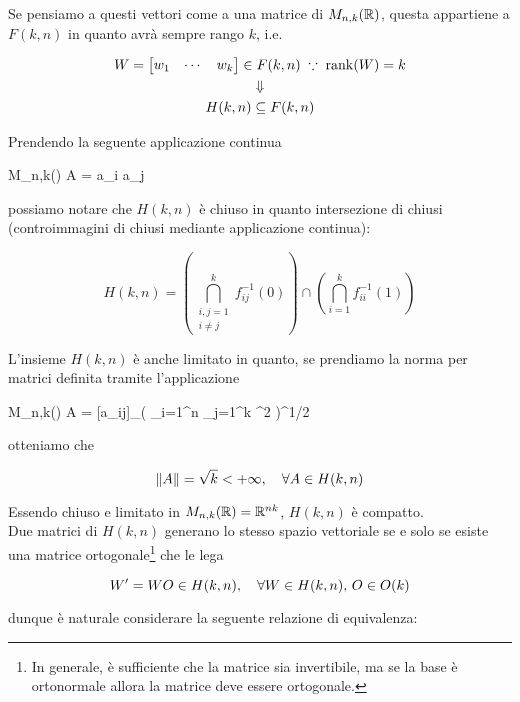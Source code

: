 {Se pensiamo a questi vettori come a una matrice di $ M_{n,k}(\mathbb{R}) $, questa appartiene a $ F(k,n) $ in quanto avrà sempre rango $ k $, i.e.

\begin{gather}
	W = \bmqty{ w_{1} & \cdots & w_{k} } \in F(k,n) %
	\; \because \; %
	\rank(W) = k \nonumber \\
	\Downarrow \\
	H(k,n) \subseteq F(k,n) \nonumber
\end{gather}

Prendendo la seguente applicazione continua

	{M_{n,k}(\R)}{\R}
	{A = }{a_{i} \cdot a_{j}}

possiamo notare che $ H(k,n) $ è chiuso in quanto intersezione di chiusi (controimmagini di chiusi mediante applicazione continua):

\begin{equation}
	H(k,n) = \left( \bigcap_{\substack{ i,j = 1 \\ i \neq j }}^{k} f_{ij}^{-1}(0) \right) \cap \left( \bigcap_{i = 1}^{k} f_{ii}^{-1}(1) \right)
\end{equation}

L'insieme $ H(k,n) $ è anche limitato in quanto, se prendiamo la norma per matrici definita tramite l'applicazione

\map{\norm{}}
	{M_{n,k}(\R)}{\R}
	{A = [a_{ij}]_{}}{\left( \sum_{i=1}^{n} \sum_{j=1}^{k} ^{2} \right)^{1/2}}

otteniamo che

\begin{equation}
	\norm{A} = \sqrt{k} < + \infty \qcomma \forall A \in H(k,n)
\end{equation}

Essendo chiuso e limitato in $ M_{n,k}(\mathbb{R}) = \mathbb{R}^{nk} $, $ H(k,n) $ è compatto. \\
Due matrici di $ H(k,n) $ generano lo stesso spazio vettoriale se e solo se esiste una matrice ortogonale\footnote{%
	In generale, è sufficiente che la matrice sia invertibile, ma se la base è ortonormale allora la matrice deve essere ortogonale.%
} che le lega

\begin{equation}
	W' = W O \in H(k,n) \qcomma \forall W \in H(k,n), \, O \in O(k)
\end{equation}

dunque è naturale considerare la seguente relazione di equivalenza:

}
